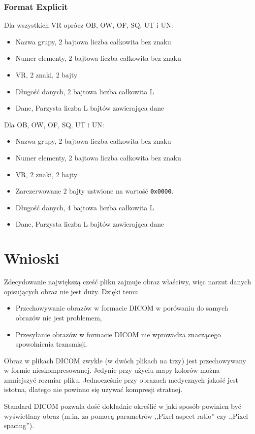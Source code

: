 \documentclass{beamer}
\begin{document}
\begin{frame}[allowframebreaks]
  \frametitle{Format Explicit}

Dla wszystkich VR oprócz OB, OW, OF, SQ, UT i UN:
\begin{itemize}
  \item Nazwa grupy, 2 bajtowa liczba całkowita bez znaku
  \item Numer elementy, 2 bajtowa liczba całkowita bez znaku
  \item VR, 2 znaki, 2 bajty
  \item Długość danych, 2 bajtowa liczba całkowita L
  \item Dane, Parzysta liczba L bajtów zawierająca dane  
\end{itemize}

\framebreak

Dla OB, OW, OF, SQ, UT i UN:
\begin{itemize}
  \item Nazwa grupy, 2 bajtowa liczba całkowita bez znaku
  \item Numer elementy, 2 bajtowa liczba całkowita bez znaku
  \item VR, 2 znaki, 2 bajty
  \item Zarezerwowane 2 bajty ustwione na wartość \texttt{0x0000}.
  \item Długość danych, 4 bajtowa liczba całkowita L
  \item Dane, Parzysta liczba L bajtów zawierająca dane  
\end{itemize}
\end{frame}






\section{Wnioski}
\begin{frame}
	Zdecydowanie największą cześć pliku zajmuje obraz właściwy, więc narzut danych opisujących obraz nie jest duży. Dzięki temu
	\begin{itemize}
		\item Przechowywanie obrazów w formacie DICOM w porówaniu do samych obrazów nie jest problemem,
		\item Przesyłanie obrazów w formacie DICOM nie wprowadza znaczącego spowolnienia transmisji.
	\end{itemize}
\end{frame}
\begin{frame}
	Obraz w plikach DICOM zwykle (w dwóch plikach na trzy) jest przechowywany w formie nieskompresowanej. Jedynie przy użyciu mapy kolorów można zmniejszyć rozmiar pliku. Jednocześnie przy obrazach medycznych jakość jest istotna, dlatego nie powinno się używać kompresji stratnej.
\end{frame}
\begin{frame}
	Standard DICOM pozwala dość dokładnie określić w jaki sposób powinien być wyświetlany obraz (m.in. za pomocą parametrów ,,Pixel aspect ratio'' czy ,,Pixel spacing'').
\end{frame}

\end{document}

